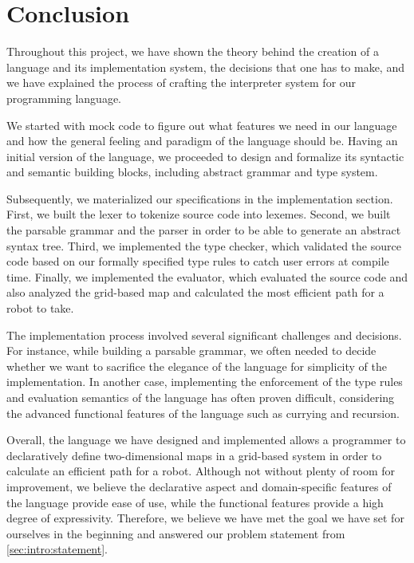 \chapter{Conclusion}

Throughout this project, we have shown the theory behind the creation of a language and its implementation system, the decisions that one has to make, and we have explained the process of crafting the interpreter system for our programming language.
\par
We started with mock code to figure out what features we need in our language and how the general feeling and paradigm of the language should be. Having an initial version of the language, we proceeded to design and formalize its syntactic and semantic building blocks, including abstract grammar and type system.
\par 
Subsequently, we materialized our specifications in the implementation section. First, we built the lexer to tokenize source code into lexemes. Second, we built the parsable grammar and the parser in order to be able to generate an abstract syntax tree. Third, we implemented the type checker, which validated the source code based on our formally specified type rules to catch user errors at compile time. Finally, we implemented the evaluator, which evaluated the source code and also analyzed the grid-based map and calculated the most efficient path for a robot to take.  
\par
The implementation process involved several significant challenges and decisions. For instance, while building a parsable grammar, we often needed to decide whether we want to sacrifice the elegance of the language for simplicity of the implementation. In another case, implementing the enforcement of the type rules and evaluation semantics of the language has often proven difficult, considering the advanced functional features of the language such as currying and recursion.
\par
Overall, the language we have designed and implemented allows a programmer to declaratively define two-dimensional maps in a grid-based system in order to calculate an efficient path for a robot. Although not without plenty of room for improvement, we believe the declarative aspect and domain-specific features of the language provide ease of use, while the functional features provide a high degree of expressivity. Therefore, we believe we have met the goal we have set for ourselves in the beginning and answered our problem statement from \cref{sec:intro:statement}. 


